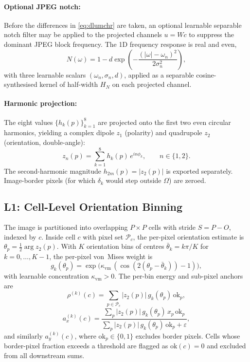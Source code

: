 \documentclass[11pt,a4paper]{article}
\newcommand{\abs}[1]{\left\lvert#1\right\rvert}
\begin{document}
\paragraph{Optional JPEG notch:}
Before the differences in \cref{eq:dlumchr} are taken, an optional learnable separable notch filter may be applied to the projected channels $u = Wc$ to suppress the dominant JPEG block frequency. The 1D frequency response is real and even,
\begin{equation}\label{eq:notch}
  N(\omega) = 1 - d \exp\!\left(-\frac{(\abs{\omega} - \omega_n)^2}{2\sigma_n^2}\right),
\end{equation}
with three learnable scalars $(\omega_n, \sigma_n, d)$, applied as a separable cosine-synthesised kernel of half-width $H_N$ on each projected channel.

\paragraph{Harmonic projection:}
The eight values $\{h_k(p)\}_{k=1}^{8}$ are projected onto the first two even circular harmonics, yielding a complex dipole $z_1$ (polarity) and quadrupole $z_2$ (orientation, double-angle):
\begin{equation}\label{eq:zn}
  \boxed{\;
  z_n(p) = \sum_{k=1}^{8} h_k(p)\, e^{i n \phi_k},
  \qquad n \in \{1, 2\}.\;}
\end{equation}
The second-harmonic magnitude $h_{2m}(p) = \abs{z_2(p)}$ is exported separately. Image-border pixels (for which $\delta_k$ would step outside $\Omega$) are zeroed.

\subsection{L1: Cell-Level Orientation Binning}\label{sec:l1}

The image is partitioned into overlapping $P{\times}P$ cells with stride $S = P - O$, indexed by $c$. Inside cell $c$ with pixel set $\mathcal{P}_c$, the per-pixel orientation estimate is $\theta_p = \tfrac{1}{2}\arg z_2(p)$. With $K$ orientation bins of centres $\bar\theta_k = k\pi/K$ for $k=0,\dots,K-1$, the per-pixel von~Mises weight is
\begin{equation}\label{eq:vm-weight}
  g_k(\theta_p) = \exp\!\bigl(\kappa_{\mathrm{vm}}\,(\cos(2(\theta_p - \bar\theta_k)) - 1)\bigr),
\end{equation}
with learnable concentration $\kappa_{\mathrm{vm}} > 0$. The per-bin energy and sub-pixel anchors are
\begin{equation}\label{eq:rho-bin}
  \boxed{\;
  \rho^{(k)}(c) = \sum_{p \in \mathcal{P}_c} \abs{z_2(p)}\, g_k(\theta_p)\, \mathrm{ok}_p,\;}
\end{equation}
\begin{equation}\label{eq:anchor-bin}
  a_x^{(k)}(c) = \frac{\sum_{p} \abs{z_2(p)}\, g_k(\theta_p)\, x_p\, \mathrm{ok}_p}{\sum_{p} \abs{z_2(p)}\, g_k(\theta_p)\, \mathrm{ok}_p + \varepsilon},
\end{equation}
and similarly $a_y^{(k)}(c)$, where $\mathrm{ok}_p \in \{0,1\}$ excludes border pixels. Cells whose border-pixel fraction exceeds a threshold are flagged as $\mathrm{ok}(c) = 0$ and excluded from all downstream sums.
\end{document}
